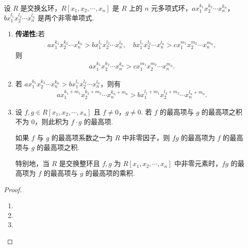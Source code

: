 \documentclass[../../main.tex]{subfiles}%
\begin{document}
\begin{theorem}[单项式的字典排序法的基本性质]\label{theorem:单项式的字典排序法的基本性质}
设 \( R \) 是交换幺环，\( R[x_1, x_2, \cdots, x_n] \) 是 \( R \) 上的 \( n \) 元多项式环，\( ax_1^{k_1}x_2^{k_2}\cdots x_n^{k_n} \)，\( bx_1^{l_1}x_2^{l_2}\cdots x_n^{l_n} \) 是两个非零单项式. 
\begin{enumerate}[(1)]
\item \textbf{传递性:}若
\begin{align*}
ax_1^{k_1}x_2^{k_2}\cdots x_n^{k_n} > bx_1^{l_1}x_2^{l_2}\cdots x_n^{l_n}, \quad bx_1^{l_1}x_2^{l_2}\cdots x_n^{l_n} > cx_1^{m_1}x_2^{m_2}\cdots x_n^{m_n},
\end{align*}
则
\begin{align*}
ax_1^{k_1}x_2^{k_2}\cdots x_n^{k_n} > cx_1^{m_1}x_2^{m_2}\cdots x_n^{m_n}.
\end{align*}

\item 若 \( ax_1^{k_1}x_2^{k_2}\cdots x_n^{k_n} > bx_1^{l_1}x_2^{l_2}\cdots x_n^{l_n} \)，则有
\begin{align*}
ax_1^{k_1+m_1}x_2^{k_2+m_2}\cdots x_n^{k_n+m_n} > bx_1^{l_1+m_1}x_2^{l_2+m_2}\cdots x_n^{l_n+m_n}.
\end{align*}

\item\label{theorem:单项式的字典排序法的基本性质-3} 设 \( f, g \in R[x_1, x_2, \cdots, x_n] \) 且 \( f \neq 0 \)，\( g \neq 0 \). 若 \( f \) 的最高项与 \( g \) 的最高项之积不为 \( 0 \)，则此积为 \( f \cdot g \) 的最高项.

如果 \( f \) 与 \( g \) 的最高项系数之一为 \( R \) 中非零因子，则 \( fg \) 的最高项为 \( f \) 的最高项与 \( g \) 的最高项之积.

特别地，当 \( R \) 是交换整环且 \( f, g \) 为 \( R[x_1, x_2, \cdots, x_n] \) 中非零元素时，\( fg \) 的最高项为 \( f \) 的最高项与 \( g \) 的最高项的乘积.
\end{enumerate}
\end{theorem}
\begin{proof}
\begin{enumerate}[(1)]
\item 

\item 

\item 
\end{enumerate}
\end{proof}
\end{document}
